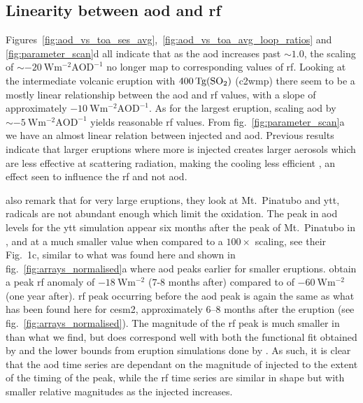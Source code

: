 \documentclass{ametsocV6.1}
\newcommand{\iso}[1][i]{{#1}njected \ce{SO2}}
\begin{document}

\subsection{Linearity between \gls{aod} and \gls{rf}}

Figures~\ref{fig:aod_vs_toa_ses_avg},~\ref{fig:aod_vs_toa_avg_loop_ratios} and
\ref{fig:parameter_scan}d all indicate that as the \gls{aod} increases past \(\sim
1.0\), the scaling of \(\sim \SI{-20}{\watt\metre^{-2}\mathrm{AOD}^{-1}}\) no longer map
to corresponding values of \gls{rf}. Looking at the intermediate volcanic eruption with
\(\SI{400}{\tera\gram(\ce{SO2})}\) (\gls{c2wmp}) there seem to be a mostly linear
relationship between the \gls{aod} and \gls{rf} values, with a slope of approximately
\(\SI{-10}{\watt\metre^{-2}\mathrm{AOD}^{-1}}\). As for the largest eruption, scaling
\gls{aod} by \(\sim \SI{-5}{\watt\metre^{-2}\mathrm{AOD}^{-1}}\) yields reasonable
\gls{rf} values. From fig.~\ref{fig:parameter_scan}a we have an almost linear relation
between \iso{} and \gls{aod}. Previous results indicate that larger eruptions where more
 is injected creates larger aerosols which are less effective at scattering
radiation, making the cooling less efficient
\citep{english2013,timmreck2010,timmreck2018}, an effect seen to influence the \gls{rf}
and not \gls{aod}.

\citet{timmreck2010} also remark that for very large eruptions, they look at Mt.\
Pinatubo and \gls{ytt},  radicals are not abundant enough which limit the
\ce{SO2} oxidation. The peak in \gls{aod} levels for the \gls{ytt} simulation appear six
months after the peak of Mt.\ Pinatubo in \citet{timmreck2010}, and at a much smaller
value when compared to a \(100\times\) scaling, see their Fig.\ 1c, similar to what was
found here and shown in fig.~\ref{fig:arrays_normalised}a where \gls{aod} peaks earlier
for smaller eruptions. \citet{timmreck2010} obtain a peak \gls{rf} anomaly of
\(\SI{-18}{\watt\metre^{-2}}\) (\(7\)-\(8\) months after) compared to \citet{jones2005}
of \(\SI{-60}{\watt\metre^{-2}}\) (one year after). \gls{rf} peak occurring before the
\gls{aod} peak is again the same as what has been found here for \gls{cesm2},
approximately \(6\)--\(8\) months after the eruption (see
fig.~\ref{fig:arrays_normalised}). The magnitude of the \gls{rf} peak is much smaller in
\citet{timmreck2010} than what we find, but does correspond well with both the
functional fit obtained by \citet{niemeier2015} and the lower bounds from eruption
simulations done by \citet{marshall2020}. As such, it is clear that the \gls{aod} time
series are dependant on the magnitude of \iso{} to the extent of the timing of the peak,
while the \gls{rf} time series are similar in shape but with smaller relative magnitudes
as the \iso{} increases.
\end{document}
